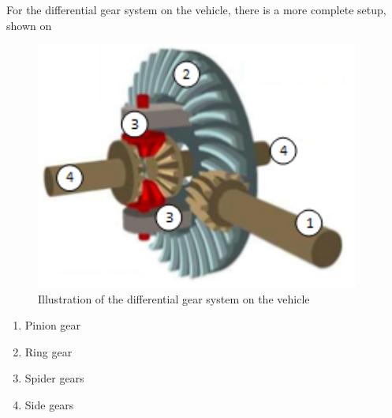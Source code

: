For the differential gear system on the vehicle, there is a more complete setup, shown on 

\begin{minipage}{\linewidth}
      \centering
      \begin{minipage}{0.65\linewidth}
          \begin{figure}[H]
              \includegraphics[width=0.95\textwidth]{figures/diffGearFull}
              \caption{Illustration of the differential gear system on the vehicle \cite{MechanicalEngineering}}
              \label{diffGearFull}
          \end{figure}
      \end{minipage}
      \hspace{0.05\linewidth}
      \begin{minipage}{0.25\linewidth}
      		\begin{enumerate}
      			\item Pinion gear
      			\item Ring gear
      			\item Spider gears
      			\item Side gears
      		\end{enumerate}
      \end{minipage}
  \end{minipage}





